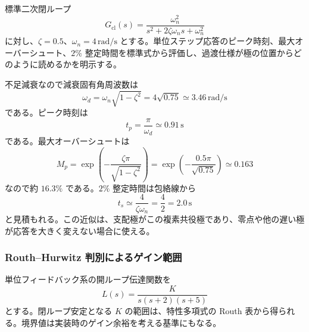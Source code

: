 標準二次閉ループ
\begin{equation}
  G_{\mathrm{cl}}(s)=
  \frac{\omega_n^2}{s^2+2\zeta\omega_n s+\omega_n^2}
\end{equation}
に対し、$\zeta=0.5$、$\omega_n=4\,\mathrm{rad/s}$ とする。単位ステップ応答のピーク時刻、最大オーバーシュート、$2\%$ 整定時間を標準式から評価し、過渡仕様が極の位置からどのように読めるかを明示する。

\begin{derivation}
不足減衰なので減衰固有角周波数は
\begin{equation}
  \omega_d=\omega_n\sqrt{1-\zeta^2}
  =4\sqrt{0.75}\simeq3.46\,\mathrm{rad/s}
\end{equation}
である。ピーク時刻は
\begin{equation}
  t_p=\frac{\pi}{\omega_d}\simeq0.91\,\mathrm{s}
\end{equation}
である。最大オーバーシュートは
\begin{equation}
  M_p=
  \exp\left(
    -\frac{\zeta\pi}{\sqrt{1-\zeta^2}}
  \right)
  =
  \exp\left(-\frac{0.5\pi}{\sqrt{0.75}}\right)
  \simeq0.163
\end{equation}
なので約 $16.3\%$ である。$2\%$ 整定時間は包絡線から
\begin{equation}
  t_s\simeq\frac{4}{\zeta\omega_n}
  =\frac{4}{2}=2.0\,\mathrm{s}
\end{equation}
と見積もれる。この近似は、支配極がこの複素共役極であり、零点や他の遅い極が応答を大きく変えない場合に使える。
\end{derivation}

\subsubsection{Routh--Hurwitz 判別によるゲイン範囲}

単位フィードバック系の開ループ伝達関数を
\begin{equation}
  L(s)=\frac{K}{s(s+2)(s+5)}
\end{equation}
とする。閉ループ安定となる $K$ の範囲は、特性多項式の Routh 表から得られる。境界値は実装時のゲイン余裕を考える基準にもなる。

